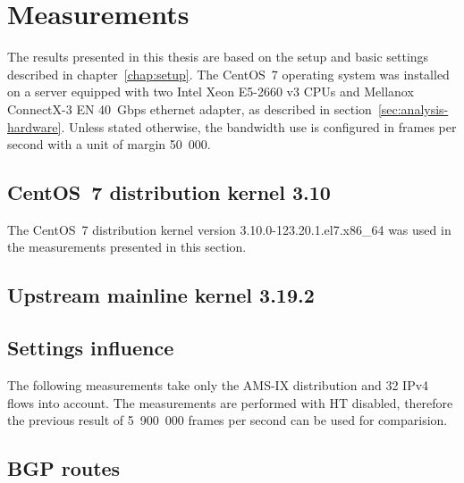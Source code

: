 
\chapter{Measurements}\label{chap:measurements}
The results presented in this thesis are based on the setup and basic settings described in chapter~\ref{chap:setup}.
The CentOS~7 operating system
was installed on a server equipped with two Intel Xeon E5-2660 v3 CPUs
and Mellanox ConnectX-3 EN 40~Gbps ethernet adapter, as described in section~\ref{sec:analysis-hardware}.
Unless stated otherwise,
the bandwidth use is configured in frames per second with a unit of margin 50~000.

\section{CentOS~7 distribution kernel 3.10}
The CentOS~7 distribution kernel version 3.10.0-123.20.1.el7.x86\_64
was used in the measurements presented in this section.

	
	
	
	
	
	
	
	
	
	
	
	
	
	
	


\section{Upstream mainline kernel 3.19.2}

	
	
	

\section{Settings influence}

	
	
The following measurements take only the AMS-IX distribution and 32 IPv4 flows into account.
The measurements are performed with HT disabled,
therefore the previous result of 5~900~000 frames per second can be used for comparision.

	

	

	


\section{BGP routes}

	
